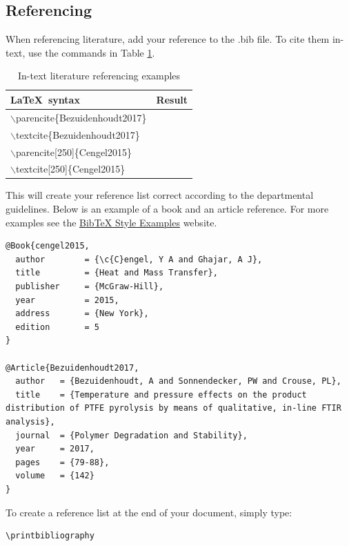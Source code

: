 \documentclass[a4paper,12pt]{article}
\begin{document}
\subsection{Referencing}


When referencing literature, add your reference to the .bib file. To cite them in-text, use the commands in Table \ref{tab:Cite}.

\begin{table}[!ht]
\centering
\caption{In-text literature referencing examples}
\label{tab:Cite}
\begin{tabular}{ll}
\toprule
\LaTeX\ syntax & Result\\
\midrule
$\backslash$parencite\{Bezuidenhoudt2017\} &\parencite{Bezuidenhoudt2017} \\
$\backslash$textcite\{Bezuidenhoudt2017\} & \textcite{Bezuidenhoudt2017} \\
$\backslash$parencite[250]\{Cengel2015\} &\parencite[250]{Cengel2015} \\
$\backslash$textcite[250]\{Cengel2015\} & \textcite[250]{Cengel2015} \\
\bottomrule
\end{tabular}
\end{table}

This will create your reference list correct according to the departmental guidelines. Below is an example of a book and an article reference. For more examples see the \href{https://www.verbosus.com/bibtex-style-examples.html}{BibTeX Style Examples} website. 

\begin{lstlisting}
@Book{cengel2015,
  author		= {\c{C}engel, Y A and Ghajar, A J},
  title			= {Heat and Mass Transfer},
  publisher		= {McGraw-Hill},
  year			= 2015,
  address		= {New York},
  edition		= 5
}

@Article{Bezuidenhoudt2017,
  author   = {Bezuidenhoudt, A and Sonnendecker, PW and Crouse, PL},
  title	   = {Temperature and pressure effects on the product distribution of PTFE pyrolysis by means of qualitative, in-line FTIR analysis},
  journal  = {Polymer Degradation and Stability},
  year	   = 2017,
  pages	   = {79-88},
  volume   = {142}
}
\end{lstlisting}

To create a reference list at the end of your document, simply type: 
\begin{lstlisting}
\printbibliography
\end{lstlisting} 
\nocite{*}

\printbibliography
\end{document}
